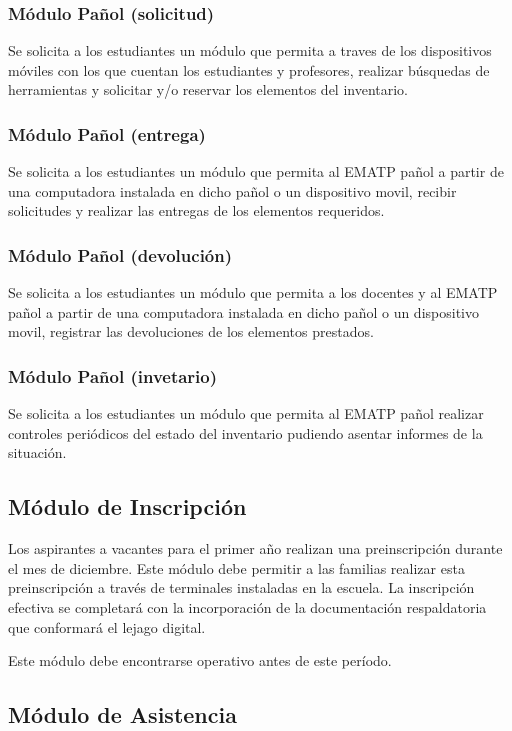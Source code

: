 \subsubsection{Módulo Pañol (solicitud)}
Se solicita a los estudiantes un módulo que permita a traves de los dispositivos móviles con los que cuentan los estudiantes y profesores, realizar búsquedas de herramientas y solicitar y/o reservar los elementos del inventario.
\subsubsection{Módulo Pañol (entrega)}
Se solicita a los estudiantes un módulo que permita al EMATP pañol a partir de una computadora instalada en dicho pañol o un dispositivo movil, recibir solicitudes y realizar las entregas de los elementos requeridos.
\subsubsection{Módulo Pañol (devolución)}
Se solicita a los estudiantes un módulo que permita a los docentes y al EMATP pañol a partir de una computadora instalada en dicho pañol o un dispositivo movil, registrar las devoluciones de los elementos prestados.

\subsubsection{Módulo Pañol (invetario)}
Se solicita a los estudiantes un módulo que permita al EMATP pañol realizar controles periódicos del estado del inventario pudiendo asentar informes de la situación.


\subsection{Módulo de Inscripción}

Los aspirantes a vacantes para el primer año realizan una preinscripción durante el mes de diciembre. Este módulo debe permitir a las familias realizar esta preinscripción a través de terminales instaladas en la escuela. La inscripción efectiva se completará con la incorporación de la documentación respaldatoria que conformará el lejago digital.

Este módulo debe encontrarse operativo antes de este período.

\subsection{Módulo de Asistencia}

